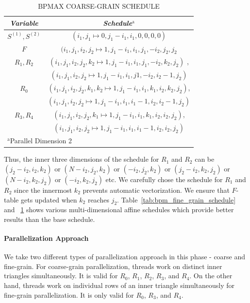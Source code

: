 \begin{table}[htbp]
\caption{\uppercase{BPMax coarse-grain schedule}}
\begin{center}
\begin{tabular}{|c|c|}
\hline
\textbf{\textit{Variable}}& \textbf{\textit{Schedule}}$^{\mathrm{a}}$ \\
\hline
  $S^{(1)}, S^{(2)}$ & $(i_{1},j_{1} \mapsto 0, j_{1}-i_{1}, i_{1}, 0, 0, 0, 0)$   \\
\cline{1-2} 
  $F$ & $(i_{1},j_{1},i_{2},j_{2} \mapsto 1, j_{1}-i_{1}, i_{1}, j_{1}, -i_{2}, j_{2}, j_{2}$   \\
\cline{1-2} 
$R_{1}, R_{2}$ & $(i_{1},j_{1},i_{2},j_{2},k_{2} \mapsto 1, j_{1}-i_{1}, i_{1}, j_{1}, -i_{2}, k_{2}, j_{2})$ ,   \\
 & $(i_{1},j_{1},i_{2},j_{2} \mapsto 1, j_{1}-i_{1}, i_{1}, j1, -i_{2}, i_{2}-1, j_{2})$ \\
 \cline{1-2} 
$R_{0}$ & $(i_{1},j_{1},i_{2},j_{2},k_{1},k_{2} \mapsto 1, j_{1}-i_{1}, i_{1}, k_{1}, i_{2}, k_{2}, j_{2})$,    \\
 & $(i_{1},j_{1},i_{2},j_{2} \mapsto 1, j_{1}-i_{1}, i_{1}, i_{1}-1, i_{2}, i_{2}-1, j_{2})$ \\
\cline{1-2} 
$R_{3}, R_{4}$ & $(i_{1},j_{1},i_{2},j_{2},k_{1} \mapsto 1, j_{1}-i_{1}, i_{1}, k_{1}, i_{2}, i_{2}, j_{2})$,    \\
 & $(i_{1},j_{1},i_{2},j_{2} \mapsto 1, j_{1} -i_{1}, i_{1}, i_{1}-1, i_{2}, i_{2}, j_{2})$ \\
 \cline{1-2} 
\hline
\multicolumn{2}{l}{$^{\mathrm{a}}$Parallel Dimension 2}
\end{tabular}
\label{tab:bpm_coarse_grain_schedule}
\end{center}
\end{table}
Thus, the inner three dimensions of the schedule for $R_{1}$ and $R_{2}$ can be $(j_{2}-i_{2}, i_{2}, k_{2})$ or $(N-i_{2}, j_{2}, k_{2})$ or $(-i_{2}, j_{2}, k_{2})$ or $(j_{2}-i_{2}, k_{2}, j_{2})$ or $(N-i_{2}, k_{2}, j_{2})$ or $(-i_{2}, k_{2}, j_{2})$ etc. We carefully chose the schedule for $R_{1}$ and $R_{2}$ since the innermost $k_{2}$ prevents automatic vectorization.  We  ensure that $F$-table gets updated when $k_{2}$ reaches $j_{2}$. Table~\ref{tab:bpm_fine_grain_schedule} and ~\ref{tab:bpm_coarse_grain_schedule}  shows various multi-dimensional affine schedules which provide better results than the base schedule.  
 
\paragraph{Parallelization Approach} 
We take two different types of parallelization approach in this phase - coarse and fine-grain. For coarse-grain parallelization, threads work on distinct inner triangles simultaneously.  It is valid for $R_{0}$, $R_{1}$, $R_{2}$, $R_{3}$, and $R_{4}$. On the other hand, threads work on individual rows of an inner triangle simultaneously for fine-grain parallelization. It is only valid for $R_{0}$, $R_{3}$, and $R_{4}$. 



